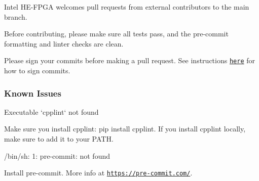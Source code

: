 Intel H\-E-\/\-F\-P\-G\-A welcomes pull requests from external contributors to the {\ttfamily main} branch.

Before contributing, please make sure all tests pass, and the pre-\/commit formatting and linter checks are clean.

Please sign your commits before making a pull request. See instructions \href{https://docs.github.com/en/github/authenticating-to-github/managing-commit-signature-verification/signing-commits}{\tt here} for how to sign commits.

\subsubsection*{Known Issues}


\begin{DoxyItemize}
\item {\ttfamily Executable `cpplint` not found}

Make sure you install cpplint\-: {\ttfamily pip install cpplint}. If you install {\ttfamily cpplint} locally, make sure to add it to your {\ttfamily P\-A\-T\-H}.
\item {\ttfamily /bin/sh\-: 1\-: pre-\/commit\-: not found}

Install {\ttfamily pre-\/commit}. More info at \href{https://pre-commit.com/}{\tt https\-://pre-\/commit.\-com/}. 
\end{DoxyItemize}
